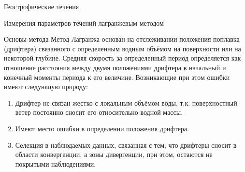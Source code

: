 \begin{chapter}{Геострофические течения}
\begin{section}{Измерения параметров течений лагранжевым методом}
\begin{paragraph}{Основы метода}
Метод Лагранжа основан на отслеживании положения поплавка (дрифтера)
связанного с определенным водным объёмом на поверхности или на
некоторой глубине. Средняя скорость за определенный период
определяется как отношение расстояния между двумя положениями дрифтера
в начальный и конечный моменты периода к его величине. Возникающие при
этом ошибки имеют следующую природу:
%
\begin{enumerate}
\item
Дрифтер не связан жестко с локальным объёмом воды, т.к. поверхностный
ветер постоянно сносит его относительно водной массы.
%

\item
Имеют место ошибки в определении положения дрифтера.
%

\item
Селекция в наблюдаемых данных, связанная с тем, что дрифтеры сносит в
области конвергенции, а зоны дивергенции, при этом, остаются не
покрытыми наблюдениями.
%
\end{enumerate}


\end{paragraph}
\end{section}
\end{chapter}
